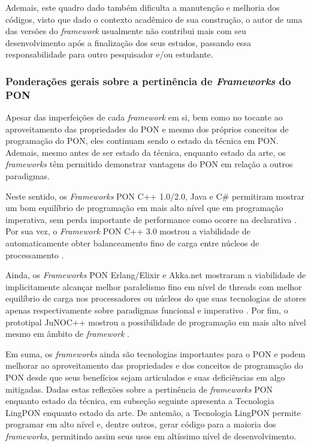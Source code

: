 Ademais, este quadro dado também dificulta a manutenção e melhoria dos códigos,
visto que dado o contexto acadêmico de sua construção, o autor de uma das
versões do \textit{framework} usualmente não contribui mais com seu
desenvolvimento após a finalização dos seus estudos, passando essa
responsabilidade para outro pesquisador e/ou estudante.

\subsubsection{Ponderações gerais sobre a pertinência de \textit{Frameworks} do PON}

Apesar das imperfeições de cada \textit{framework} em si, bem como no tocante ao
aproveitamento das propriedades do PON e mesmo dos próprios conceitos de
programação do PON, eles continuam sendo o estado da técnica em PON. Ademais,
mesmo antes de ser estado da técnica, enquanto estado da arte, os
\textit{frameworks} têm permitido demonstrar vantagens do PON em relação a outros
paradigmas. 

Neste sentido, os \textit{Frameworks} PON C++ 1.0/2.0, Java e C\# permitiram
mostrar um bom equilíbrio de programação em mais alto nível que em programação
imperativa, sem perda importante de performance como ocorre na declarativa
\cite{msc_Banaszewski_2009,henzen_2015,ronszcka_2017}. Por sua vez, o
\textit{Framework} PON C++ 3.0 mostrou a viabilidade de automaticamente obter
balanceamento fino de carga entre núcleos de processamento
\cite{belmonte_2012,belmonte_2016}. 

Ainda, os \textit{Frameworks} PON Erlang/Elixir e Akka.net mostraram a
viabilidade de implicitamente alcançar melhor paralelismo fino em nível de
threads com melhor equilíbrio de carga nos processadores ou núcleos do que suas
tecnologias de atores apenas respectivamente sobre paradigmas funcional e
imperativo \cite{martini_2019,msc_negrini_2019}. Por fim, o prototipal JuNOC++
mostrou a possibilidade de programação em mais alto nível mesmo em âmbito de
\textit{framework} \cite{chierichi_2020}. 

Em suma, os \textit{frameworks} ainda são tecnologias importantes para o PON e
podem melhorar ao aproveitamento das propriedades e dos conceitos de programação
do PON desde que seus benefícios sejam articulados e suas deficiências em algo
mitigadas. Dadas estas reflexões sobre a pertinência de \textit{frameworks} PON
enquanto estado da técnica, em subseção seguinte apresenta a Tecnologia LingPON
enquanto estado da arte. De antemão, a Tecnologia LingPON permite programar em
alto nível e, dentre outros, gerar código para a maioria dos \textit{frameworks},
permitindo assim seus usos em altíssimo nível de desenvolvimento. 

